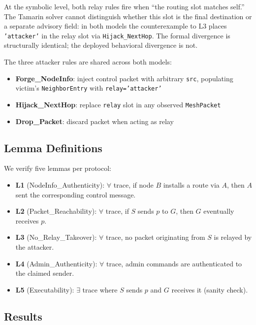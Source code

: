 \documentclass[journal]{IEEEtran}
\begin{document}
At the symbolic level, both relay rules fire when ``the routing slot
matches self.'' The Tamarin solver cannot distinguish whether this slot
is the final destination or a separate advisory field: in both models
the counterexample to L3 places \texttt{'attacker'} in the relay slot
via \texttt{Hijack\_NextHop}. The formal divergence is structurally
identical; the deployed behavioral divergence is not.

The three attacker rules are shared across both models:
\begin{itemize}
  \item \textbf{Forge\_NodeInfo}: inject control packet with arbitrary
    \texttt{src}, populating victim's \texttt{NeighborEntry} with
    \texttt{relay='attacker'}
  \item \textbf{Hijack\_NextHop}: replace \texttt{relay} slot in any
    observed \texttt{MeshPacket}
  \item \textbf{Drop\_Packet}: discard packet when acting as relay
\end{itemize}

\subsection{Lemma Definitions}

We verify five lemmas per protocol:

\begin{itemize}
  \item \textbf{L1} (NodeInfo\_Authenticity): $\forall$ trace, if node $B$
    installs a route via $A$, then $A$ sent the corresponding control message.
  \item \textbf{L2} (Packet\_Reachability): $\forall$ trace, if $S$ sends $p$
    to $G$, then $G$ eventually receives $p$.
  \item \textbf{L3} (No\_Relay\_Takeover): $\forall$ trace, no packet
    originating from $S$ is relayed by the attacker.
  \item \textbf{L4} (Admin\_Authenticity): $\forall$ trace, admin commands
    are authenticated to the claimed sender.
  \item \textbf{L5} (Executability): $\exists$ trace where $S$ sends $p$
    and $G$ receives it (sanity check).
\end{itemize}

\subsection{Results}
\end{document}
